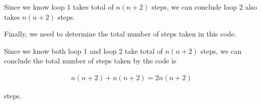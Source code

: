 \documentclass[12pt]{article}
\begin{document}
\begin{enumerate}[a.]
\begin{mdframed}
    \bigskip

    Since we know loop 1 takes total of $n(n+2)$ steps, we can conclude loop 2
    also takes $n(n+2)$ steps.
    \color{black}

    \bigskip

    Finally, we need to determine the total number of steps taken in this code.

    \bigskip

    Since \color{red}we know both loop 1 and loop 2 take total of $n(n+2)$ steps,\color{black}\:
    we can conclude the total number of steps taken by the code is

    \color{red}
    \begin{align}
        n(n+2) + n(n+2) = 2n(n+2)
    \end{align}
    \color{black}

    steps.


    \end{mdframed}

\end{enumerate}
\end{document}
